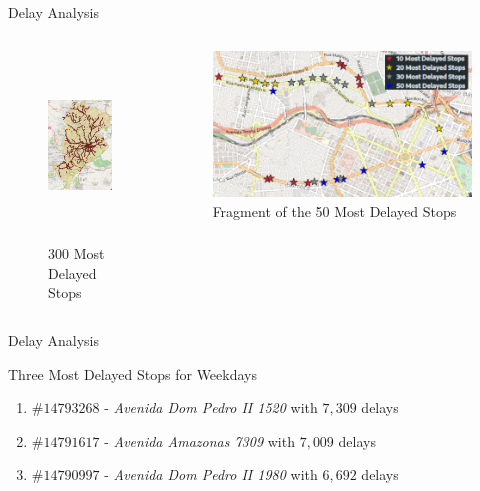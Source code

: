 \documentclass[xcolor=dvipsnames,table]{beamer}
\begin{document}
\begin{frame}{Delay Analysis}
        \begin{columns}
                \begin{figure}[H]
                        \centering
                        \caption{300 Most Delayed Stops}
                        \includegraphics[height=5cm, keepaspectratio]{images/mostDelayedStops.png}
                \end{figure}
                \begin{figure}[t]
                        \centering
                        \caption{Fragment of the 50 Most Delayed Stops }
                        \includegraphics[width=\linewidth]{images/10-50MostDelayedStops.png}
                \end{figure}
        \end{columns}
\end{frame}
\begin{frame}{Delay Analysis}
        \begin{block}{Three Most Delayed Stops for Weekdays}
                \begin{enumerate}
                        \item $\#14793268$ - \textit{Avenida Dom Pedro II 1520} with $7,309$ delays 
                        \item $\#14791617$ - \textit{Avenida Amazonas 7309} with $7,009$ delays
                        \item $\#14790997$ - \textit{Avenida Dom Pedro II 1980} with $6,692$ delays 
                \end{enumerate}
        \end{block}
\end{frame}
\end{document}
